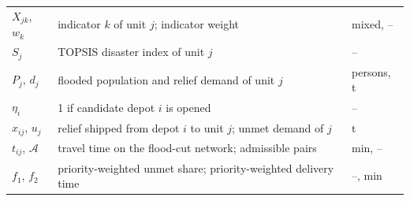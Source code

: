\begin{longtable}{p{}p{}p{}}
$X_{jk}$, $w_k$ & indicator $k$ of unit $j$; indicator weight & mixed, -- \\
$S_j$ & TOPSIS disaster index of unit $j$ & -- \\
$P_j$, $d_j$ & flooded population and relief demand of unit $j$ & persons, t \\
$\eta_i$ & 1 if candidate depot $i$ is opened & -- \\
$x_{ij}$, $u_j$ & relief shipped from depot $i$ to unit $j$; unmet demand of $j$ & t \\
$t_{ij}$, $\mathcal A$ & travel time on the flood-cut network; admissible pairs & min, -- \\
$f_1$, $f_2$ & priority-weighted unmet share; priority-weighted delivery time & --, min \\
\end{longtable}
\endgroup
\addtocounter{table}{-1}%
